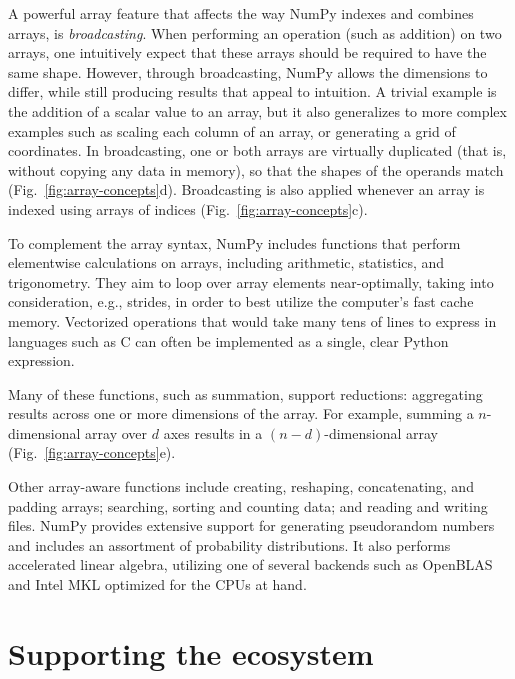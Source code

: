 A powerful array feature that affects the way NumPy indexes and combines
arrays, is {\em broadcasting}.
When performing an operation (such as addition) on two arrays, one intuitively
expect that these arrays should be required to have the same shape.
However, through broadcasting, NumPy allows the dimensions to differ, while
still producing results that appeal to intuition.
A trivial example is the addition of a scalar value to an array, but it also
generalizes to more complex examples such as scaling each column of an array,
or generating a grid of coordinates.
In broadcasting, one or both arrays are virtually duplicated (that is, without
copying any data in memory), so that the shapes of the operands match
(Fig.~\ref{fig:array-concepts}d).
Broadcasting is also applied whenever an array is indexed using arrays of
indices (Fig.~\ref{fig:array-concepts}c).

To complement the array syntax, NumPy includes functions that perform
elementwise calculations on arrays, including arithmetic, statistics, and
trigonometry.
They aim to loop over array elements near-optimally, taking into consideration,
e.g., strides, in order to best utilize the computer's fast cache memory.
Vectorized operations that would take many tens of lines to express in
languages such as C can often be implemented as a single, clear Python
expression.

Many of these functions, such as summation, support reductions: aggregating
results across one or more dimensions of the array.
For example, summing a $n$-dimensional array over $d$ axes results in a
$(n-d)$-dimensional array (Fig.~\ref{fig:array-concepts}e).

Other array-aware functions include creating, reshaping, concatenating, and padding
arrays; searching, sorting and counting data; and reading and writing files.
NumPy provides extensive support for generating pseudorandom numbers and
includes an assortment of probability distributions.
It also performs accelerated linear algebra, utilizing one of several backends
such as OpenBLAS \cite{wang2013augem,xianyi2012model} and Intel MKL optimized for the CPUs at hand.

\section*{Supporting the ecosystem}



